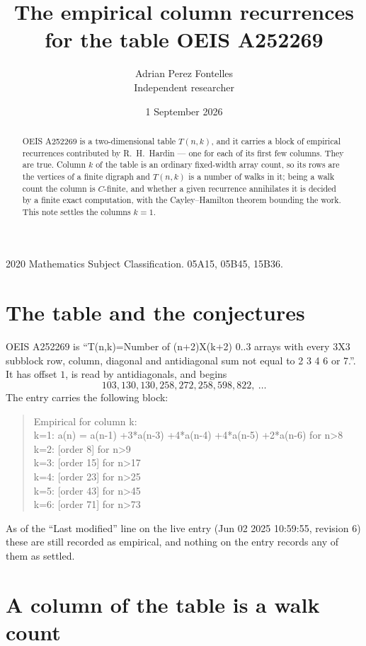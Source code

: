 \documentclass[11pt,a4paper]{article}
\title{The empirical column recurrences for the table OEIS A252269}
\author{Adrian Perez Fontelles\\ \small Independent researcher}
\date{1 September 2026}
\theoremstyle{plain}
\theoremstyle{definition}
\begin{document}
\maketitle

\begin{abstract}
OEIS A252269 is a two-dimensional table $T(n,k)$, and it carries a block of empirical
recurrences contributed by R.~H.~Hardin --- one for each of its first few columns. They are
true. Column $k$ of the table is an ordinary fixed-width array count, so its rows are the
vertices of a finite digraph and $T(n,k)$ is a number of walks in it; being a walk count the
column is $C$-finite, and whether a given recurrence annihilates it is decided by a finite
exact computation, with the Cayley--Hamilton theorem bounding the work. This note settles the columns $k=1$.
\end{abstract}

\noindent\small 2020 Mathematics Subject Classification. 05A15, 05B45, 15B36.\normalsize

\section{The table and the conjectures}

OEIS A252269 is ``T(n,k)=Number of (n+2)X(k+2) 0..3 arrays with every 3X3 subblock row, column, diagonal and antidiagonal sum not equal to 2 3 4 6 or 7.''. It has offset $1$, is
read by antidiagonals, and begins
\[
103, 130, 130, 258, 272, 258, 598, 822,\ \dots
\]
The entry carries the following block:
\begin{quote}\small
Empirical for column k:\\
k=1: a(n) = a(n-1) +3*a(n-3) +4*a(n-4) +4*a(n-5) +2*a(n-6) for n>8\\
k=2: [order 8] for n>9\\
k=3: [order 15] for n>17\\
k=4: [order 23] for n>25\\
k=5: [order 43] for n>45\\
k=6: [order 71] for n>73\\
\end{quote}
As of the ``Last modified'' line on the live entry (Jun 02 2025 10:59:55, revision 6) these are still
recorded as empirical, and nothing on the entry records any of them as settled.

\section{A column of the table is a walk count}
\end{document}
